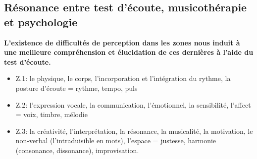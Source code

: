 \subsection*{Résonance entre test d'écoute, musicothérapie et
	psychologie}
\textbf{L'existence de difficultés de perception dans les zones nous
	induit à une meilleure compréhension et  élucidation de ces dernières à l'aide du
	test d'écoute.}
\begin{itemize}
	\item  Z.1: le physique, le corps, l'incorporation et
	l'intégration du rythme,
	la posture d'écoute  =  rythme, tempo, puls
	\item  Z.2:  l'expression vocale, la communication,
	l'émotionnel, la sensibilité, l'affect = voix, timbre, mélodie
		\item Z.3: la créativité, l'interprétation, la
	résonance, la musicalité, la motivation, le non-verbal (l'intraduisible en mots), l'espace = justesse, 
	harmonie (consonance,
	dissonance), improvisation.
\end{itemize}

